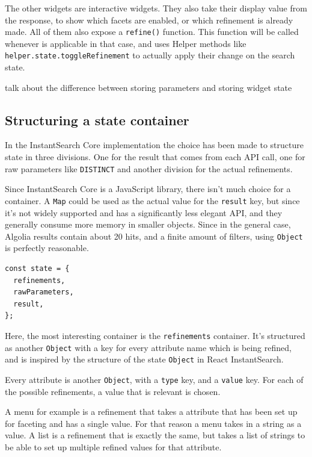 The other widgets are interactive widgets. They also take their display value from the response, to show which facets are enabled, or which refinement is already made. All of them also expose a {\tt refine()} function. This function will be called whenever is applicable in that case, and uses Helper methods like {\tt helper.state.toggleRefinement} to actually apply their change on the search state.

talk about the difference between storing parameters and storing widget state

\subsection{Structuring a state container}
\label{sub:structuring_a_state_container}

In the InstantSearch Core implementation the choice has been made to structure state in three divisions. One for the result that comes from each API call, one for raw parameters like {\tt DISTINCT} and another division for the actual refinements.

Since InstantSearch Core is a JavaScript library, there isn't much choice for a container. A {\tt Map}\cite{mdn-map} could be used as the actual value for the {\tt result} key, but since it's not widely supported and has a significantly less elegant API, and they generally consume more memory in smaller objects. Since in the general case, Algolia results contain about 20 hits, and a finite amount of filters, using {\tt Object} is perfectly reasonable.

\begin{lstlisting}[caption={The state container of InstantSearch Core},label={lst:is-core-state-1}]
const state = {
  refinements,
  rawParameters,
  result,
};
\end{lstlisting}

Here, the most interesting container is the {\tt refinements} container. It's structured as another {\tt Object} with a key for every attribute name which is being refined, and is inspired by the structure of the state {\tt Object} in React InstantSearch\cite{react-instantsearch-search-state}.

Every attribute is another {\tt Object}, with a {\tt type} key, and a {\tt value} key. For each of the possible refinements, a value that is relevant is chosen. 

A menu for example is a refinement that takes a attribute that has been set up for faceting\cite{algolia-set-up-faceting} and has a single value. For that reason a menu takes in a string as a value. A list is a refinement that is exactly the same, but takes a list of strings to be able to set up multiple refined values for that attribute.

